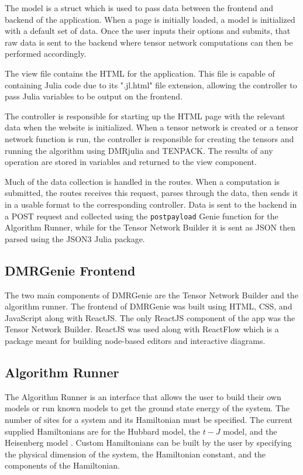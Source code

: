 \documentclass{juliacon}
\begin{document}
The model is a struct which is used to pass data between the frontend and backend of the application. 
When a page is initially loaded, a model is initialized with a default set of data. Once the user inputs their options and submits, that raw data is sent to the backend where tensor network computations can then be performed accordingly.

The view file contains the HTML for the application. This file is capable of containing Julia code due to its ".jl.html" file extension, allowing the controller to pass Julia variables to be output on the frontend. 

The controller is responsible for starting up the HTML page with the relevant data when the website is initialized. When a tensor network is created or a tensor network function is run, the controller is responsible for creating the tensors and running the algorithm using DMRjulia and TENPACK. The results of any operation are stored in variables and returned to the view component.

Much of the data collection is handled in the routes. When a computation is submitted, the routes receives this request, parses through the data, then sends it in a usable format to the corresponding controller. Data is sent to the backend in a POST request and collected using the \texttt{postpayload} Genie function for the Algorithm Runner, while for the Tensor Network Builder it is sent as JSON then parsed using the JSON3 Julia package.

\subsection{DMRGenie Frontend}
The two main components of DMRGenie are the Tensor Network Builder and the algorithm runner. The frontend of DMRGenie was built using HTML, CSS, and JavaScript along with ReactJS. The only ReactJS component of the app was the Tensor Network Builder. ReactJS was used along with ReactFlow which is a package meant for building node-based editors and interactive diagrams. 

\subsection{Algorithm Runner}
The Algorithm Runner is an interface that allows the user to build their own models or run known models to get the ground state energy of the system. The number of sites for a system and its Hamiltonian must be specified. The current supplied Hamiltonians are for the Hubbard model, the $t-J$ model, and the Heisenberg model \cite{fradkin2013field}. Custom Hamiltonians can be built by the user by specifying the physical dimension of the system, the Hamiltonian constant, and the components of the Hamiltonian.
\end{document}
